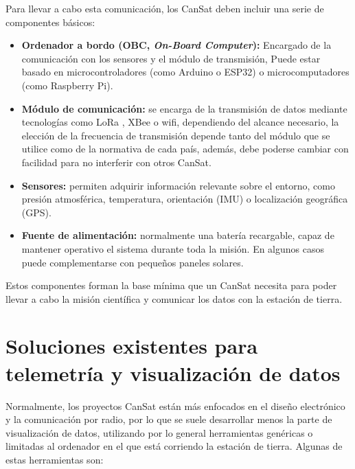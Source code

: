Para llevar a cabo esta comunicación, los CanSat deben incluir una serie de componentes básicos:
\begin{itemize}
    \item \textbf{Ordenador a bordo (OBC, \emph{On-Board Computer}):} Encargado de la comunicación con los sensores y el módulo de transmisión, Puede estar basado en microcontroladores (como Arduino o ESP32) o microcomputadores (como Raspberry Pi).
    \item \textbf{Módulo de comunicación:} se encarga de la transmisión de datos mediante tecnologías como LoRa \cite{lora2015overview}, XBee \cite{xbee} o wifi, dependiendo del alcance necesario,
    la elección de la frecuencia de transmisión depende tanto del módulo que se utilice como de la normativa de cada país, además, debe poderse cambiar con facilidad para no interferir con otros CanSat.
    \item \textbf{Sensores:} permiten adquirir información relevante sobre el entorno, como presión atmosférica, temperatura, orientación (IMU) o localización geográfica (GPS).
    \item \textbf{Fuente de alimentación:} normalmente una batería recargable, capaz de mantener operativo el sistema durante toda la misión. En algunos casos puede complementarse con pequeños paneles solares.
\end{itemize}

Estos componentes forman la base mínima que un CanSat necesita para poder llevar a cabo la misión científica y comunicar los datos con la estación de tierra.


\section{Soluciones existentes para telemetría y visualización de datos}
Normalmente, los proyectos CanSat están más enfocados en el diseño electrónico y la comunicación por radio,
por lo que se suele desarrollar menos la parte de visualización de datos, utilizando por lo general herramientas genéricas
o limitadas al ordenador en el que está corriendo la estación de tierra. Algunas de estas herramientas son:

